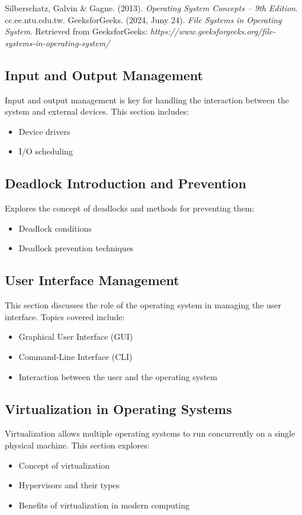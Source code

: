 \documentclass[12pt]{article}
\begin{document}
\begin{thebibliography}{99}
        Silberschatz, Galvin \& Gagne. (2013). \textit{Operating System Concepts – 9th Edition}. cc.ee.ntu.edu.tw.
        GeeksforGeeks. (2024, Juny 24). \textit{File Systems in Operating System}. Retrieved from GeeksforGeeks: \textit{https://www.geeksforgeeks.org/file-systems-in-operating-system/}
    \end{thebibliography}

\subsection{Input and Output Management}
Input and output management is key for handling the interaction between the system and external devices. This section includes:
\begin{itemize}
    \item Device drivers
    \item I/O scheduling
\end{itemize}

\subsection{Deadlock Introduction and Prevention}
Explores the concept of deadlocks and methods for preventing them:
\begin{itemize}
    \item Deadlock conditions
    \item Deadlock prevention techniques
\end{itemize}

\subsection{User Interface Management}
This section discusses the role of the operating system in managing the user interface. Topics covered include:
\begin{itemize}
    \item Graphical User Interface (GUI)
    \item Command-Line Interface (CLI)
    \item Interaction between the user and the operating system
\end{itemize}

\subsection{Virtualization in Operating Systems}
Virtualization allows multiple operating systems to run concurrently on a single physical machine. This section explores:
\begin{itemize}
    \item Concept of virtualization
    \item Hypervisors and their types
    \item Benefits of virtualization in modern computing
\end{itemize}
\end{document}
